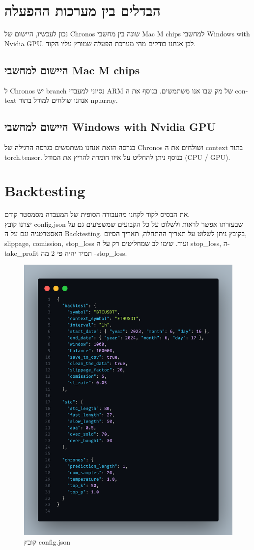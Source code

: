 \documentclass[a4paper,11pt]{article}
\newcommand{\te}[1]{\textenglish{#1}}
\begin{document}
\begin{RTL}
\section*{הבדלים בין מערכות ההפעלה}
נכון לעכשיו, היישום של \te{Chronos}  שונה בין מחשבי \te{Mac M chips} למחשבי \te{Windows with Nvidia GPU}. לכן אנחנו בודקים מהי מערכת הפעלה שמורץ עליו הקוד.

\subsection*{היישום למחשבי \te{Mac M chips}}
ל \te{Chronos} יש \te{branch} נסיוני למעבדי \te{ARM} של מק שבו אנו משתמשים. בנוסף  את ה \te{context} אנחנו שולחים למודל בתור \te{np.array}.

\subsection*{היישום למחשבי \te{Windows with Nvidia GPU}}
בגרסה הזאת אנחנו משתמשים בגרסה הרגילה של \te{Chronos} ושולחים את ה \te{context} בתור \te{torch.tensor}. 
בנוסף ניתן להחליט על איזו חומרה להריץ את המודל (\te{CPU / GPU}).
\newpage
\section{\te{Backtesting}}
את הבסיס לקוד לקחנו מהעבודה הסופית של המעבדה מסמסטר קודם. \\
יצרנו קובץ \te{config.json} שבעזרתו אפשר לראות ולשלוט על כל הקבועים שמשפיעים גם על האסטרטגיה וגם על ה \te{Backtesting}. בקובץ ניתן לשלוט על תאריך ההתחלה, תאריך הסיום, \te{slippage, comission, stop\_loss} ועוד. שימו לב שמחליטים רק על ה \te{stop\_loss}, ה-\te{take\_profit} תמיד יהיה פי 2 מה -\te{stop\_loss}. 
\begin{figure}[H]
    \centering
    \includegraphics[width=.8\textwidth]{config.png}
    \caption{קובץ \te{config.json}}
\end{figure}


\end{RTL}
\end{document}
